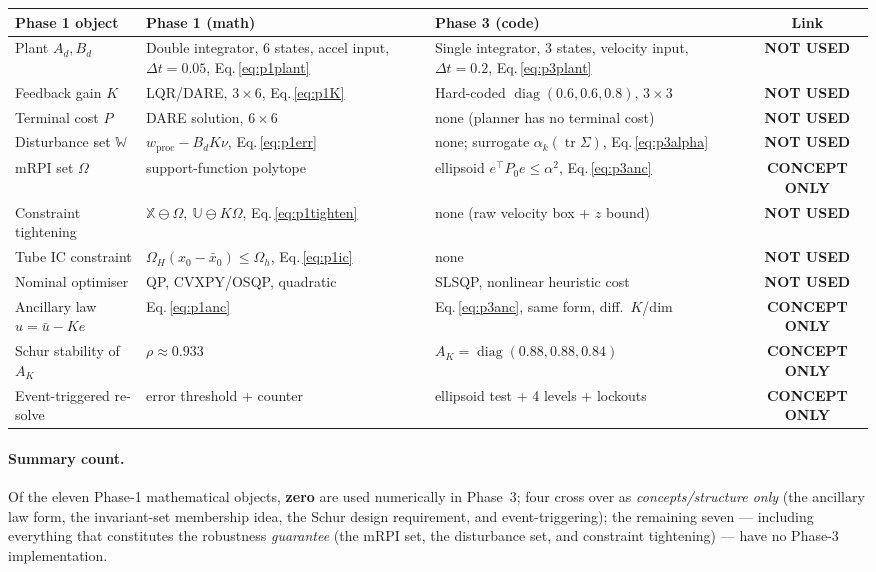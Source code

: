 \documentclass[11pt]{article}
\DeclareMathOperator{\tr}{tr}
\DeclareMathOperator{\diag}{diag}
\newcommand{\Wset}{\mathbb{W}}
\newcommand{\Xset}{\mathbb{X}}
\newcommand{\Uset}{\mathbb{U}}
\newcommand{\no}{{\color{red!75!black}\textbf{NOT USED}}}
\newcommand{\concept}{{\color{orange!85!black}\textbf{CONCEPT ONLY}}}
\begin{document}
\renewcommand{\arraystretch}{1.35}
\begin{longtable}{p{4.5cm} p{4.3cm} p{4.3cm} c}
\toprule
\textbf{Phase 1 object} & \textbf{Phase 1 (math)} & \textbf{Phase 3 (code)} & \textbf{Link} \\
\midrule
\endhead
Plant $A_d,B_d$ & Double integrator, $6$ states, accel input, $\Delta t{=}0.05$, Eq.\,\eqref{eq:p1plant} & Single integrator, $3$ states, velocity input, $\Delta t{=}0.2$, Eq.\,\eqref{eq:p3plant} & \no \\
Feedback gain $K$ & LQR/DARE, $3\times6$, Eq.\,\eqref{eq:p1K} & Hard-coded $\diag(0.6,0.6,0.8)$, $3\times3$ & \no \\
Terminal cost $P$ & DARE solution, $6\times6$ & none (planner has no terminal cost) & \no \\
Disturbance set $\Wset$ & $w_{\mathrm{proc}}-B_dK\nu$, Eq.\,\eqref{eq:p1err} & none; surrogate $\alpha_k(\tr\Sigma)$, Eq.\,\eqref{eq:p3alpha} & \no \\
mRPI set $\Omega$ & support-function polytope & ellipsoid $e^\top P_0e\le\alpha^2$, Eq.\,\eqref{eq:p3anc} & \concept \\
Constraint tightening & $\Xset\ominus\Omega,\ \Uset\ominus K\Omega$, Eq.\,\eqref{eq:p1tighten} & none (raw velocity box + $z$ bound) & \no \\
Tube IC constraint & $\Omega_H(x_0-\bar x_0)\le\Omega_h$, Eq.\,\eqref{eq:p1ic} & none & \no \\
Nominal optimiser & QP, CVXPY/OSQP, quadratic & SLSQP, nonlinear heuristic cost & \no \\
Ancillary law $u=\bar u-Ke$ & Eq.\,\eqref{eq:p1anc} & Eq.\,\eqref{eq:p3anc}, same form, diff.\ $K$/dim & \concept \\
Schur stability of $A_K$ & $\rho\approx0.933$ & $A_K=\diag(0.88,0.88,0.84)$ & \concept \\
Event-triggered re-solve & error threshold + counter & ellipsoid test + 4 levels + lockouts & \concept \\
\bottomrule
\end{longtable}

\paragraph{Summary count.} Of the eleven Phase-1 mathematical objects, \textbf{zero} are used
numerically in Phase~3; four cross over as \emph{concepts/structure only} (the ancillary law form,
the invariant-set membership idea, the Schur design requirement, and event-triggering); the
remaining seven --- including everything that constitutes the robustness \emph{guarantee} (the mRPI
set, the disturbance set, and constraint tightening) --- have no Phase-3 implementation.
\end{document}

